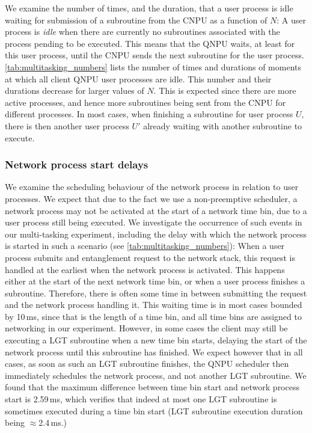 We examine the number of times, and the duration, that a user process is idle waiting for submission of a subroutine from the \ac{CNPU} as a function of $N$: A user process is \textit{idle} when there are currently no subroutines associated with the process pending to be executed. This means that the \ac{QNPU} waits, at least for this user process, until the \ac{CNPU} sends the next subroutine for the user process. \cref{tab:multitasking_numbers} lists the number of times and durations of moments at which all client \ac{QNPU} user processes are idle. This number and their durations decrease for larger values of $N$. This is expected since there are more active processes, and hence more subroutines being sent from the \ac{CNPU} for different processes. In most cases, when finishing a subroutine for user process $U$, there is then another user process $U'$ already waiting with another subroutine to execute.

\subsubsection{Network process start delays}

We examine the scheduling behaviour of the network process in relation to user processes. We expect that due to the fact we use a non-preemptive scheduler, a network process may not be activated at the start of a network time bin, due to a user process still being executed. We investigate the occurrence of such events in our multi-tasking experiment, including the delay with which the network process is started in such a scenario (see \cref{tab:multitasking_numbers}): When a user process submits and entanglement request to the network stack, this request is handled at the earliest when the network process is activated. This happens either at the start of the next network time bin, or when a user process finishes a subroutine. Therefore, there is often some time in between submitting the request and the network process handling it. This waiting time is in most cases bounded by 10\,ms, since that is the length of a time bin, and all time bins are assigned to networking in our experiment. However, in some cases the client may still be executing a \ac{LGT} subroutine when a new time bin starts, delaying the start of the network process until this subroutine has finished. We expect however that in all cases, as soon as such an \ac{LGT} subroutine finishes, the \ac{QNPU} scheduler then immediately schedules the network process, and not another \ac{LGT} subroutine. We found that the maximum difference between time bin start and network process start is 2.59\,ms, which verifies that indeed at most one \ac{LGT} subroutine is sometimes executed during a time bin start (\ac{LGT} subroutine execution duration being $\approx$2.4\,ms.)

